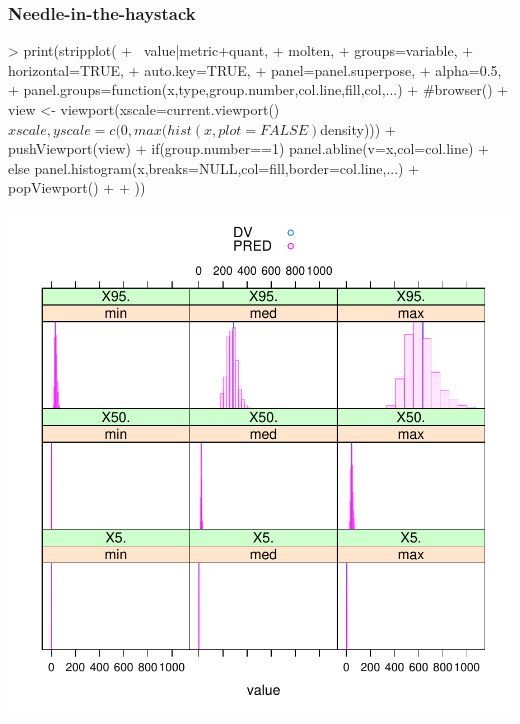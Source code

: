 \subsubsection{Needle-in-the-haystack}
\begin{Schunk}
\begin{Sinput}
> print(stripplot(
+ 	~value|metric+quant,
+ 	molten,
+ 	groups=variable,
+ 	horizontal=TRUE,
+ 	auto.key=TRUE,
+ 	panel=panel.superpose,
+ 	alpha=0.5,
+ 	panel.groups=function(x,type,group.number,col.line,fill,col,...){
+ 		#browser()
+ 		view <- viewport(xscale=current.viewport()$xscale,yscale=c(0,max(hist(x,plot=FALSE)$density)))
+ 		pushViewport(view)
+ 		if(group.number==1) panel.abline(v=x,col=col.line)
+ 		else panel.histogram(x,breaks=NULL,col=fill,border=col.line,...)
+ 		popViewport()
+ 	}
+ ))
\end{Sinput}
\end{Schunk}
\includegraphics{model1-haystack}
